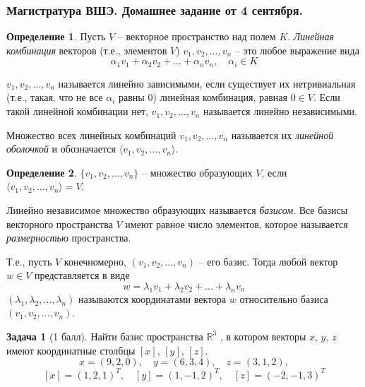 \documentclass[12pt, fleqn]{extarticle}
\newcommand{\real}{\mathbb{R}}
\theoremstyle{definition}
\newtheorem{definition}{Определение}
\newtheorem{problem}{Задача}
\theoremstyle{remark}
\begin{document}
\clearpage

\thispagestyle{empty}
\subsubsection*{Магистратура ВШЭ. Домашнее задание от 4 сентября.}


\begin{definition}
Пусть $V$ -- векторное пространство над полем $K$. 
{\it Линейная комбинация} векторов (т.е., элементов $V$) $v_{1}, v_{2}, \ldots, v_{n}$ 
-- это любое выражение вида 
$$\alpha_{1}v_{1} + \alpha_{2}v_{2} + \ldots + \alpha_{n}v_{n}, \quad \alpha_{i} \in K$$

$v_{1}, v_{2}, \ldots, v_{n}$ называется линейно зависимыми, если
существует их нетривиальная (т.е., такая, что не все $\alpha_{i}$ равны 0)
линейная комбинация, равная $0 \in V$. Если  такой линейной комбинации нет,
$v_{1}, v_{2}, \ldots, v_{n}$ называется линейно независимыми.

Множество всех линейных комбинаций $v_{1}, v_{2}, \ldots, v_{n}$ 
называется их {\it линейной оболочкой} и обозначается
$\langle v_{1}, v_{2}, \ldots, v_{n} \rangle$.
\end{definition}

 
\begin{definition}
$\{v_{1}, v_{2}, \ldots, v_{n}\}$ -- множество образующих $V$,
если $\langle v_{1}, v_{2}, \ldots, v_{n} \rangle = V$.

Линейно независимое множество образующих называется {\it базисом}.
Все базисы векторного пространства $V$ имеют равное число элементов, которое называется {\it размерностью} пространства.

Т.е., пусть $V$ конечномерно, $(v_{1}, v_{2}, \ldots, v_{n})$ -- его базис.
Тогда любой вектор $w \in V$ представляется в  виде 
$$w = \lambda_{1}v_{1} + \lambda_{2}v_{2} + \ldots + \lambda_{n}v_{n}$$
$(\lambda_{1}, \lambda_{2}, \ldots, \lambda_{n})$ называются координатами вектора $w$
относительно базиса $(v_{1}, v_{2}, \ldots, v_{n})$.
\end{definition}


\begin{problem}[1 балл]
Найти базис пространства $\real^{3}$ , в котором векторы $x$, $y$, $z$
имеют координатные столбцы $[x]$, $[y]$, $[z]$.
$$x = (9, 2, 0), \quad y = (6, 3, 4), \quad z = (3, 1, 2),$$
$$[x] = (1, 2, 1)^{T}, \quad [y] = (1, -1, 2)^{T}, \quad [z] = (-2, -1, 3)^{T}$$
\end{problem}
\end{document}
